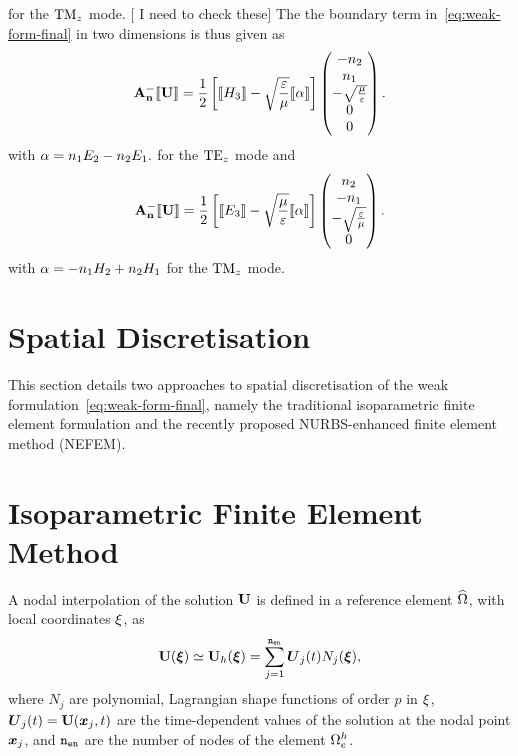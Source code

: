 for the $\textrm{TM}_{z}$ mode. [ I need to check these]
The the boundary term in~\eqref{eq:weak-form-final} in two dimensions is thus
given as
\begin{align}
\mathbf{A}_\mathbf{n}^{-} \llbracket \mathbf{U} \rrbracket =
  \frac{1}{2}
  \left[
    \llbracket H_3 \rrbracket - \sqrt{\frac{\varepsilon}{\mu}} \llbracket \alpha \rrbracket
  \right]
\begin{pmatrix}
   -n_2 \\
   n_1 \\
   - \sqrt{ \frac{\mu}{\varepsilon} } \\
   0  \\
   0 
\end{pmatrix} .
  \label{eq:AnMinuU-expression-TE}
\end{align}
with $ \alpha = n_1 E_2 - n_2 E_1. $ for the $\textrm{TE}_{z}$ mode and
\begin{align}
\mathbf{A}_\mathbf{n}^{-} \llbracket \mathbf{U} \rrbracket =
  \frac{1}{2}
  \left[
    \llbracket E_3 \rrbracket - \sqrt{\frac{\mu}{\varepsilon}} \llbracket \alpha \rrbracket
  \right]
\begin{pmatrix}
   n_2 \\
   -n_1 \\
   -\sqrt{ \frac{\varepsilon}{\mu} } \\
   0 
\end{pmatrix} . \label{eq:AnMinuU-expression-TM}
\end{align}
with $ \alpha = - n_1 H_2 + n_2 H_1 $ for the $\textrm{TM}_{z}$ mode.
\section{Spatial Discretisation}
This section details two approaches to spatial discretisation of the weak formulation~\ref{eq:weak-form-final}, namely the traditional isoparametric finite element formulation and the recently proposed NURBS-enhanced finite element method (NEFEM).

\section{Isoparametric Finite Element Method}
\label{sec:isoparametric-elements}
A nodal interpolation of the solution $\mathbf{U}$ is defined in a reference element $\widehat{\Omega}$, with local coordinates $\mathbf{\xi}$, as
\begin{equation}
\mathbf{U}(\boldsymbol{\xi}) \simeq \mathbf{U}_{h}(\boldsymbol{\xi}) = \sum_{j=1}^{\texttt{n}_{\texttt{en}}}
  \boldsymbol{U}_{j}(t)
  N_{j} (\boldsymbol{\xi})
  ,
\label{eq:nodal-basis-defn}
\end{equation}
where $N_{j}$ are polynomial, Lagrangian shape functions of order $p$ in $\mathbf{\xi}$, $\boldsymbol{U}_j(t) = \mathbf{U}(\boldsymbol{x}_j,t)$ are the time-dependent values of the solution at the nodal point $\boldsymbol{x}_j$, and $\texttt{n}_{\texttt{en}}$ are the number of nodes of the element $\Omega_e^{h}$.

